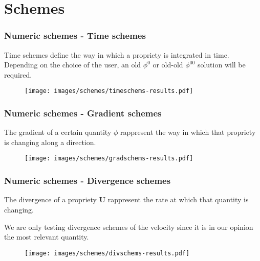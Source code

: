 \documentclass{beamer}
\newcommand{\foam}[1]{{\ttfamily #1}}
\begin{document}
\section{Schemes}
\begin{frame}
\frametitle{Numeric schemes - Time schemes}

Time schemes define the way in which a propriety is integrated in time. 
Depending on the choice of the user, an old $\phi^0$ or old-old $\phi^{00}$ solution will be required.


\begin{figure}[H]
\centering
\texttt{[image: images/schemes/timeschems-results.pdf]}
\end{figure}

\end{frame}


\begin{frame}
\frametitle{Numeric schemes - Gradient schemes}
The gradient of a certain quantity $\phi$ rappresent the way in which that propriety is changing along a direction.


\begin{figure}[H]
\centering
\texttt{[image: images/schemes/gradschems-results.pdf]}
\end{figure}


\end{frame}




\begin{frame}
\frametitle{Numeric schemes - Divergence schemes}
The divergence of a propriety $\bm{U}$ rappresent the rate at which that quantity is changing.

We are only testing divergence schemes of the velocity since it is in our opinion the most relevant quantity.

\begin{figure}[H]
\centering
\texttt{[image: images/schemes/divschems-results.pdf]}
\end{figure}


\end{frame}
\end{document}
